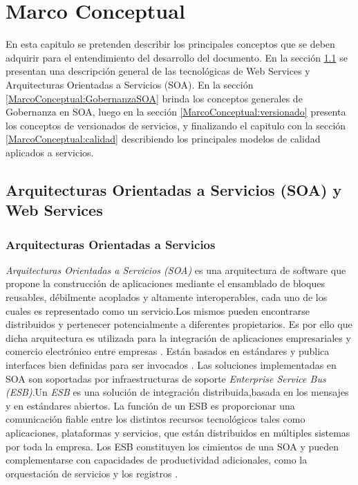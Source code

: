 \chapter{Marco Conceptual}
\label{MarcoConceptual}
En esta capitulo se pretenden describir los principales conceptos que se deben adquirir para el entendimiento del desarrollo del documento. En la sección \ref{MarcoConceptual:SOA_WSDL} se presentan una descripción general de las tecnológicas de Web Services y Arquitecturas Orientadas a Servicios (SOA). En la sección \ref{MarcoConceptual:GobernanzaSOA} brinda los conceptos generales de Gobernanza en SOA, luego en la sección \ref{MarcoConceptual:versionado} presenta los conceptos de versionados de servicios, y finalizando el capitulo con la sección \ref{MarcoConceptual:calidad} describiendo los principales modelos de calidad aplicados a servicios.

\section{Arquitecturas Orientadas a Servicios (SOA) y Web Services}
\label{MarcoConceptual:SOA_WSDL}

\subsection{Arquitecturas Orientadas a Servicios }
\label{MarcoConceptual:SOA}
\emph{Arquitecturas Orientadas a Servicios (SOA)} es una arquitectura de software que propone la construcción de aplicaciones mediante el ensamblado de bloques reusables, débilmente acoplados y altamente interoperables, cada uno de los cuales es representado como un servicio.Los mismos pueden encontrarse distribuidos y pertenecer potencialmente a diferentes propietarios. Es por ello que dicha arquitectura es utilizada para la integración de aplicaciones empresariales y comercio electrónico entre empresas \cite{SOA:definiciones}. Están basados en estándares y publica interfaces bien definidas para ser invocados \cite{WebServices:CCIA}.
Las soluciones implementadas en SOA son soportadas por infraestructuras de soporte \emph{Enterprise Service Bus (ESB)}.Un \emph{ESB} es una solución de integración distribuida,basada en los mensajes y en estándares abiertos. La función de un ESB es proporcionar una comunicación fiable entre los distintos recursos tecnológicos tales como aplicaciones, plataformas y servicios, que están distribuidos en múltiples sistemas por toda la empresa. Los ESB constituyen los cimientos de una SOA y pueden complementarse con capacidades de productividad adicionales, como la orquestación de servicios y los registros \cite{ESB:definicion}. 
